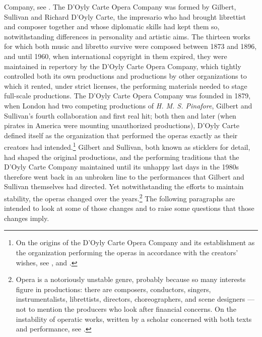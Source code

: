 \begin{paper}
{  Company, see \citealt{mackie_nothing_2018}.} The D'Oyly Carte Opera Company was formed
by Gilbert, Sullivan and Richard D'Oyly Carte, the impresario who had
brought librettist and composer together and whose diplomatic skills had
kept them so, notwithstanding differences in personality and artistic
aims. The thirteen works for which both music and libretto survive were
composed between 1873 and 1896, and until 1960, when international
copyright in them expired, they were maintained in repertory by the
D'Oyly Carte Opera Company, which tightly controlled both its own
productions and productions by other organizations to which it rented,
under strict licenses, the performing materials needed to stage
full-scale productions. The D'Oyly Carte Opera Company was founded in
1879, when London had two competing productions of \emph{H. M. S.
Pinafore}, Gilbert and Sullivan's fourth collaboration and first real
hit; both then and later (when pirates in America were mounting
unauthorized productions), D'Oyly Carte defined itself as the
organization that performed the operas exactly as their creators had
intended.\footnote{On the origins of the D'Oyly Carte Opera Company and
  its establishment as the organization performing the operas in
  accordance with the creators' wishes, see \citealt[Part B, pages  14--15]{young_introduction_2003}, and \citealt[pages 21--24]{joseph_doyly_1994}.} Gilbert and Sullivan, both known
as sticklers for detail, had shaped the original productions, and the
performing traditions that the D'Oyly Carte Company maintained until its
unhappy last days in the 1980s therefore went back in an unbroken line
to the performances that Gilbert and Sullivan themselves had directed.
Yet notwithstanding the efforts to maintain stability, the operas
changed over the years.\footnote{Opera is a notoriously unstable genre,
  probably because so many interests figure in productions: there are
  composers, conductors, singers, instrumentalists, librettists,
  directors, choreographers, and scene designers --- not to mention the
  producers who look after financial concerns. On the instability of
  operatic works, written by a scholar concerned with both texts and
  performance, see \citealt{gosset_divas_2006}.} The following paragraphs are intended
to look at some of those changes and to raise some questions that those
changes imply.


\end{paper}
